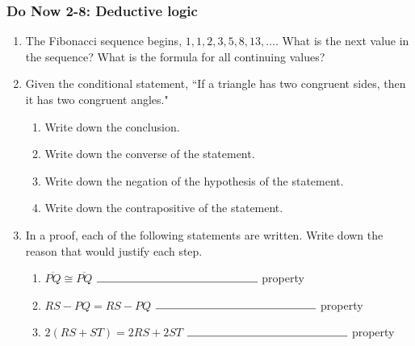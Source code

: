 \documentclass[12pt, oneside]{article}
\begin{document}
\subsubsection*{Do Now 2-8: Deductive logic}
  \vspace{0.5cm}
  \begin{enumerate}

    \item The Fibonacci sequence begins, $1, 1, 2, 3, 5, 8, 13, \dots$. What is the next value in the sequence? What is the formula for all continuing values?
    \vspace{3cm}

    \item Given the conditional statement, ``If a triangle has two congruent sides, then it has two congruent angles."
      \begin{enumerate}
        \item Write down the conclusion. \vspace{1.5cm}
        \item Write down the converse of the statement. \vspace{1.5cm}
        \item Write down the negation of the hypothesis of the statement. \vspace{1.5cm}
        \item Write down the contrapositive of the statement. \vspace{2cm}
      \end{enumerate}


      \item In a proof, each of the following statements are written. Write down the reason that would justify each step. \bigskip
        \begin{enumerate}
          \item $\overline{PQ} \cong \overline{PQ}$ \hspace{4cm} $\rule{5cm}{0.15mm}$ property \bigskip
          \item $RS - PQ= RS-PQ$  \hspace{1.7cm} $\rule{5cm}{0.15mm}$ property \bigskip
          \item $2(RS + ST)=2RS+2ST$  \hspace{0.8cm} $\rule{5cm}{0.15mm}$ property
        \end{enumerate} \bigskip


\end{enumerate}
\end{document}
